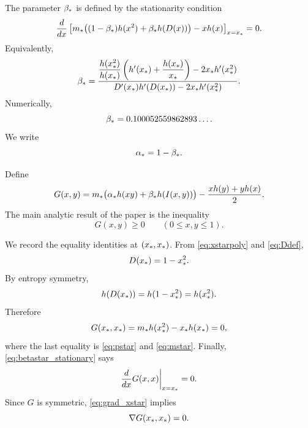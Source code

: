 The parameter \(\beta_*\) is defined by the stationarity condition
\begin{equation}\label{eq:betastar_stationary}
  \frac{d}{dx}\left[
  m_*\bigl((1-\beta_*)h(x^2)+\beta_* h(D(x))\bigr)-xh(x)
  \right]_{x=x_*}=0.
\end{equation}
Equivalently,
\begin{equation}\label{eq:betastar_formula}
  \beta_*=
  \frac{
  \dfrac{h(x_*^2)}{h(x_*)}
  \left(h'(x_*)+\dfrac{h(x_*)}{x_*}\right)
  -2x_* h'(x_*^2)
  }{
  D'(x_*)h'(D(x_*))-2x_* h'(x_*^2)
  }.
\end{equation}
Numerically,
\begin{equation}\label{eq:betastar_numeric}
  \beta_*=0.100052559862893\ldots .
\end{equation}
We write
\begin{equation}\label{eq:alpha}
  \alpha_*=1-\beta_*.
\end{equation}

Define
\begin{equation}\label{eq:Gdef}
  G(x,y)=m_*\bigl(\alpha_* h(xy)+\beta_* h(I(x,y))\bigr)-\frac{x h(y)+y h(x)}2.
\end{equation}
The main analytic result of the paper is the inequality
\begin{equation}\label{eq:main_bivar}
  G(x,y)\ge 0
  \qquad(0\le x,y\le 1).
\end{equation}

We record the equality identities at \((x_*,x_*)\).  From \eqref{eq:xstarpoly} and \eqref{eq:Ddef},
\begin{equation}\label{eq:Dxstar}
  D(x_*)=1-x_*^2.
\end{equation}
By entropy symmetry,
\begin{equation}\label{eq:h_sym_xstar}
  h(D(x_*))=h(1-x_*^2)=h(x_*^2).
\end{equation}
Therefore
\begin{equation}\label{eq:Gxstarzero}
  G(x_*,x_*)=m_* h(x_*^2)-x_* h(x_*)=0,
\end{equation}
where the last equality is \eqref{eq:pstar} and \eqref{eq:mstar}.  Finally, \eqref{eq:betastar_stationary} says
\begin{equation}\label{eq:grad_xstar}
  \frac{d}{dx}G(x,x)\bigg|_{x=x_*}=0.
\end{equation}
Since \(G\) is symmetric, \eqref{eq:grad_xstar} implies
\begin{equation}\label{eq:gradient_zero}
  \nabla G(x_*,x_*)=0.
\end{equation}

